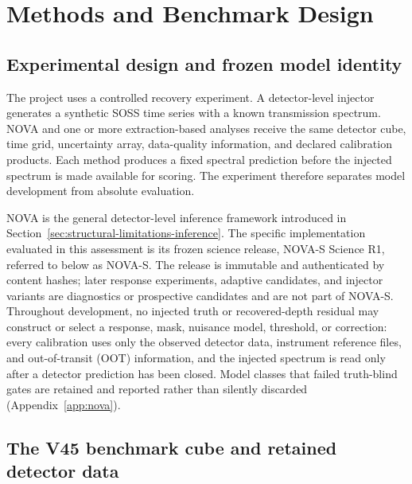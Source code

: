 \section{Methods and Benchmark Design}
\label{sec:methods}

\subsection{Experimental design and frozen model identity}


The project uses a controlled recovery experiment. A detector-level injector
generates a synthetic SOSS time series with a known transmission spectrum. NOVA
and one or more extraction-based analyses receive the same detector cube, time
grid, uncertainty array, data-quality information, and declared calibration
products. Each method produces a fixed spectral prediction before the injected
spectrum is made available for scoring. The experiment therefore separates
model development from absolute evaluation.

NOVA is the general detector-level inference framework introduced in
Section~\ref{sec:structural-limitations-inference}. The specific
implementation evaluated in this assessment is its frozen science release,
NOVA-S Science R1, referred to below as NOVA-S. The release is immutable and
authenticated by content hashes; later response experiments, adaptive
candidates, and injector variants are diagnostics or prospective candidates
and are not part of NOVA-S. Throughout development, no injected truth or
recovered-depth residual may construct or select a response, mask, nuisance
model, threshold, or correction: every calibration uses only the observed
detector data, instrument reference files, and out-of-transit (OOT)
information, and the injected spectrum is read only after a detector
prediction has been closed. Model classes that failed truth-blind gates are
retained and reported rather than silently discarded
(Appendix~\ref{app:nova}).

\subsection{The V45 benchmark cube and retained detector data}

